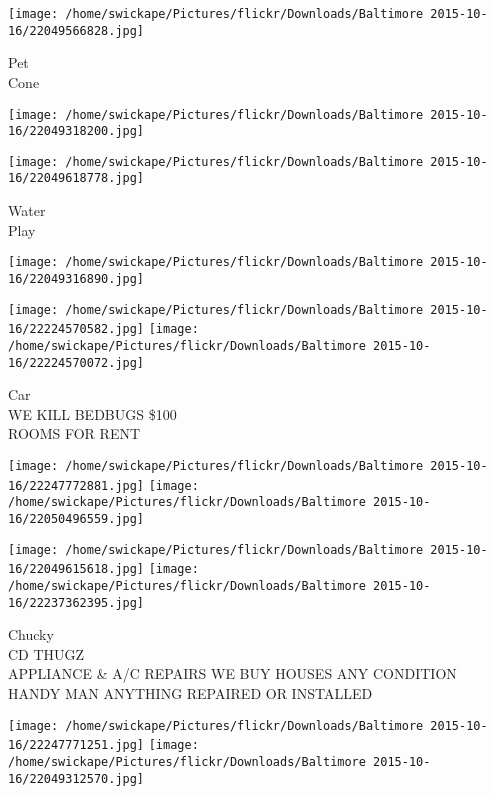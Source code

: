 \documentclass[10pt,letterpaper]{article}
\begin{document}
\vspace{0.25in}
\texttt{[image: /home/swickape/Pictures/flickr/Downloads/Baltimore 2015-10-16/22049566828.jpg]}

Pet\\
Cone\\
\pagebreak

\texttt{[image: /home/swickape/Pictures/flickr/Downloads/Baltimore 2015-10-16/22049318200.jpg]}

\vspace{0.25in}
\texttt{[image: /home/swickape/Pictures/flickr/Downloads/Baltimore 2015-10-16/22049618778.jpg]}

Water\\
Play\\
\pagebreak

\texttt{[image: /home/swickape/Pictures/flickr/Downloads/Baltimore 2015-10-16/22049316890.jpg]}

\vspace{0.25in}
\texttt{[image: /home/swickape/Pictures/flickr/Downloads/Baltimore 2015-10-16/22224570582.jpg]}
\texttt{[image: /home/swickape/Pictures/flickr/Downloads/Baltimore 2015-10-16/22224570072.jpg]}

Car\\
WE KILL BEDBUGS \$100\\
ROOMS FOR RENT\\
\pagebreak

\texttt{[image: /home/swickape/Pictures/flickr/Downloads/Baltimore 2015-10-16/22247772881.jpg]}
\texttt{[image: /home/swickape/Pictures/flickr/Downloads/Baltimore 2015-10-16/22050496559.jpg]}

\texttt{[image: /home/swickape/Pictures/flickr/Downloads/Baltimore 2015-10-16/22049615618.jpg]}
\texttt{[image: /home/swickape/Pictures/flickr/Downloads/Baltimore 2015-10-16/22237362395.jpg]}

Chucky\\
CD THUGZ\\
APPLIANCE \& A/C REPAIRS WE BUY HOUSES ANY CONDITION\\
HANDY MAN ANYTHING REPAIRED OR INSTALLED\\
\pagebreak

\texttt{[image: /home/swickape/Pictures/flickr/Downloads/Baltimore 2015-10-16/22247771251.jpg]}
\texttt{[image: /home/swickape/Pictures/flickr/Downloads/Baltimore 2015-10-16/22049312570.jpg]}
\end{document}
